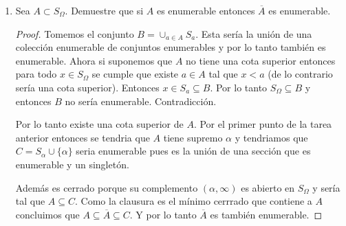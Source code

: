 \documentclass[letter,twoside,11pt]{article}
\begin{document}
\begin{enumerate}
\begin{proof}
Este ultimo resultado nos permite construir el conjunto $U_{x}$ que estabamos buscando. Si la bola $B(x)_{\epsilon_x}$ no se interseca con ninguna otra bola entonces tomamos $U_x$ como esa bola. Por otro lado, si se intersecan con una o dos bolas puedo tomar como $U_x$ la bola con radio menor a la mitad del minimo entre las distancias de los centros de las bolas que se intersecan. De esta forma se genera un conjunto de bolas abiertas disyuntas que contienen a cada uno de los puntos aislados. 

Por otra parte, por an\'alisis sabemos que los racionales son densos dentro de los reales de tal manera que dentro de cualquier abierto de $\mathbb{R}$ siempre puedo encontrar un racional. Por lo tanto, por cada conjunto abierto hay un racional distinto. Si suponemos que $X$ es no enumerable entonces $\{U_{x}\}$ tambi\'en seria no enumerable y por lo tanto abrian no enumerables racionales. Contradicci\'on.
\end{proof}

\item Sea $A \subset S_{\Omega}$. Demuestre que si $A$ es enumerable entonces $\overline{A}$ es enumerable.

\begin{proof}

Tomemos el conjunto $B= \cup_{a \in A}S_{a}$. Esta ser\'ia la uni\'on de una colecci\'on enumerable de conjuntos enumerables y por lo tanto tambi\'en es enumerable. Ahora si suponemos que $A$ no tiene una cota superior entonces para todo $x \in S_{\Omega}$ se cumple que existe $a \in A$ tal que $x<a$ (de lo contrario ser\'ia una cota superior). Entonces $x \in S_{a} \subseteq B$. Por lo tanto $S_{\Omega} \subseteq B$ y entonces $B$ no ser\'ia enumerable. Contradicci\'on.

Por lo tanto existe una cota superior de $A$. Por el primer punto de la tarea anterior entonces se tendria que $A$ tiene supremo $\alpha$ y tendriamos que $C=S_{\alpha} \cup \{\alpha\}$ seria enumerable pues es la uni\'on de una secci\'on que es enumerable y un singlet\'on.

Adem\'as es cerrado porque su complemento $(\alpha,\infty)$ es abierto en $S_{\Omega}$ y ser\'ia tal que $A \subseteq C$. Como la clausura es el m\'inimo cerrrado que contiene a $A$ concluimos que $A \subseteq \overline{A} \subseteq C$. Y por lo tanto $\overline{A}$ es tambi\'en enumerable.
\end{proof}


\end{enumerate}
\end{document}
